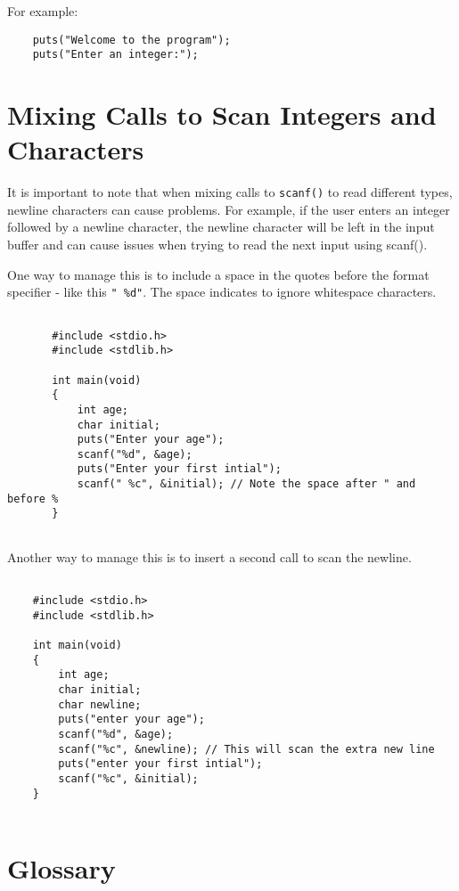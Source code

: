 For example:
\begin{verbatim}
    puts("Welcome to the program");
    puts("Enter an integer:");
\end{verbatim}
%
\section{Mixing Calls to Scan Integers and Characters}
It is important to note that when mixing calls to {\tt scanf()} to read different types, newline characters can cause problems. 
For example, if the user enters an integer followed by a newline character, the newline character will be 
left in the input buffer and can cause issues when trying to read the next input using scanf(). 

One way to manage this is to include a space in the quotes before the format specifier - like this {\tt " \%d"}. 
The space indicates to ignore whitespace characters.

\begin{verbatim}
	   
	   #include <stdio.h>
	   #include <stdlib.h>
	   
	   int main(void)
	   {
	       int age;
	       char initial;
	       puts("Enter your age");
	       scanf("%d", &age);
	       puts("Enter your first intial");
	       scanf(" %c", &initial); // Note the space after " and before %
	   }
	   
\end{verbatim}
%
 Another way to manage this is to insert a second call to scan the newline.

\begin{verbatim}

    #include <stdio.h>
    #include <stdlib.h>
    
    int main(void)
    {
        int age;
        char initial;
        char newline;
        puts("enter your age");
        scanf("%d", &age);
        scanf("%c", &newline); // This will scan the extra new line
        puts("enter your first intial");
        scanf("%c", &initial); 
    }
    
\end{verbatim}
%

\section{Glossary}

